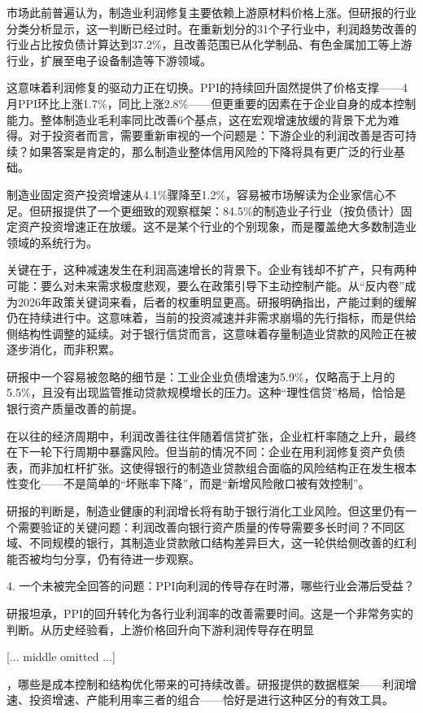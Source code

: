 \documentclass[11pt]{ctexart}
\begin{document}
市场此前普遍认为，制造业利润修复主要依赖上游原材料价格上涨。但研报的行业分类分析显示，这一判断已经过时。在重新划分的31个子行业中，利润趋势改善的行业占比按负债计算达到37.2\%，且改善范围已从化学制品、有色金属加工等上游行业，扩展至电子设备制造等下游领域。

这意味着利润修复的驱动力正在切换。PPI的持续回升固然提供了价格支撑——4月PPI环比上涨1.7\%，同比上涨2.8\%——但更重要的因素在于企业自身的成本控制能力。整体制造业毛利率同比改善6个基点，这在宏观增速放缓的背景下尤为难得。对于投资者而言，需要重新审视的一个问题是：下游企业的利润改善是否可持续？如果答案是肯定的，那么制造业整体信用风险的下降将具有更广泛的行业基础。

制造业固定资产投资增速从4.1\%骤降至1.2\%，容易被市场解读为企业家信心不足。但研报提供了一个更细致的观察框架：84.5\%的制造业子行业（按负债计）固定资产投资增速正在放缓。这不是某个行业的个别现象，而是覆盖绝大多数制造业领域的系统行为。

关键在于，这种减速发生在利润高速增长的背景下。企业有钱却不扩产，只有两种可能：要么对未来需求极度悲观，要么在政策引导下主动控制产能。从“反内卷”成为2026年政策关键词来看，后者的权重明显更高。研报明确指出，产能过剩的缓解仍在持续进行中。这意味着，当前的投资减速并非需求崩塌的先行指标，而是供给侧结构性调整的延续。对于银行信贷而言，这意味着存量制造业贷款的风险正在被逐步消化，而非积累。

研报中一个容易被忽略的细节是：工业企业负债增速为5.9\%，仅略高于上月的5.5\%，且没有出现监管推动贷款规模增长的压力。这种“理性信贷”格局，恰恰是银行资产质量改善的前提。

在以往的经济周期中，利润改善往往伴随着信贷扩张，企业杠杆率随之上升，最终在下一轮下行周期中暴露风险。但当前的情况不同：企业在用利润修复资产负债表，而非加杠杆扩张。这使得银行的制造业贷款组合面临的风险结构正在发生根本性变化——不是简单的“坏账率下降”，而是“新增风险敞口被有效控制”。

研报的判断是，制造业健康的利润增长将有助于银行消化工业风险。但这里仍有一个需要验证的关键问题：利润改善向银行资产质量的传导需要多长时间？不同区域、不同规模的银行，其制造业贷款敞口结构差异巨大，这一轮供给侧改善的红利能否被均匀分享，仍有待进一步观察。

4. 一个未被完全回答的问题：PPI向利润的传导存在时滞，哪些行业会滞后受益？

研报坦承，PPI的回升转化为各行业利润率的改善需要时间。这是一个非常务实的判断。从历史经验看，上游价格回升向下游利润传导存在明显

[... middle omitted ...]

，哪些是成本控制和结构优化带来的可持续改善。研报提供的数据框架——利润增速、投资增速、产能利用率三者的组合——恰好是进行这种区分的有效工具。
\end{document}
